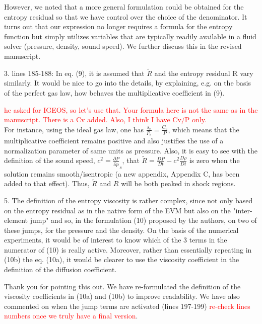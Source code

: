 \documentclass{article}
\newcommand{\tcr}[1]{\textcolor{red}{#1}}
\begin{document}
However, we noted that a more general formulation could be obtained for the entropy residual so that we have control over the choice of the denominator. It turns out that our expression no longer requires a formula for the entropy function but simply utilizes variables that are typically readily available in a fluid solver (pressure, density, sound speed). We further discuss this in the revised manuscript. 
\bigskip


{
\color{blue}
3. lines 185-188: In eq. (9), it is assumed that $\tilde{R}$ and the entropy residual R vary similarly. It would be nice to go into the details, by explaining, e.g. on the basis of the perfect gas law, how behaves the multiplicative coefficient in (9). 
}

\tcr{he asked for IGEOS, so let's use that. Your formula here is not the same as in the manuscript. There is a Cv added. Also, I think I have Cv/P only.\\}
For instance, using the ideal gas law, one has $\frac{s_e}{P_e} = \frac{C_v}{P}$,  which means that the multiplicative coefficient remains positive and also justifies the use of a normalization parameter of same units as pressure. Also, it is easy to see with the definition of the sound speed, $c^2 = \frac{\partial P}{\partial \rho}_s$, that $\tilde{R} = \frac{DP}{Dt}-c^2 \frac{D\rho}{Dt}$ is zero when the solution remains smooth/isentropic (a new appendix, Appendix C, has been added to that effect). Thus, $\tilde{R}$ and $R$ will be both peaked in shock regions.
\bigskip


{
\color{blue}
5. The definition of the entropy viscosity is rather complex, since not only based on  the entropy residual as in the native form of the EVM but also on  the "inter-element jump" and so, in the formulation (10) proposed by the authors, on two of these jumps, for the pressure and the density. On the basis of the numerical experiments, it  would be of interest to know which of the 3 terms in the numerator of (10) is really active.  Moreover, rather than essentially repeating in (10b) the eq. (10a), it would be clearer to use the viscosity coefficient in the definition of the diffusion coefficient.
}

Thank you for pointing this out. We have re-formulated the definition of the viscosity coefficients in (10a) and (10b) to improve readability. We have also commented on when the jump terms are activated (lines 197-199) \tcr{re-check lines numbers once we truly have a final version}.
\bigskip
\end{document}
